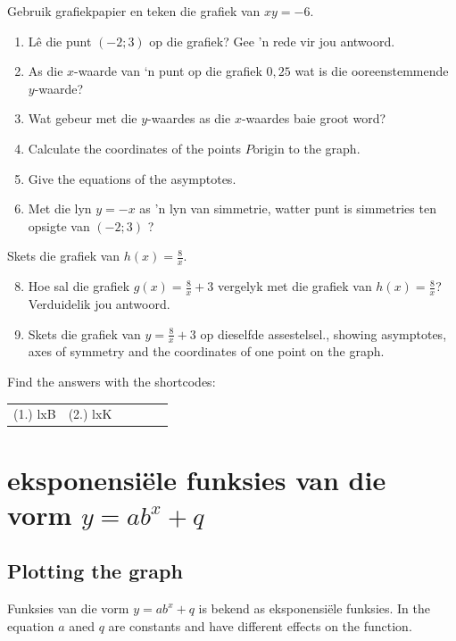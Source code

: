 \begin{exercises}{}
{
Gebruik grafiekpapier en teken die grafiek van  $xy=-6$.
    \begin{enumerate}[noitemsep, label=\textbf{\arabic*}. ] 
    \item Lê die punt $(-2; 3)$  op die grafiek? Gee ’n rede vir jou antwoord.

    \item As die $x$-waarde van ‘n punt op die grafiek $0,25$ wat is die ooreenstemmende $y$-waarde?
    \item Wat gebeur met die $y$-waardes as die $x$-waardes baie groot word?
\item Calculate the coordinates of the points $P$origin to the graph.
\item Give the equations of the asymptotes.
    \item Met die lyn $y=-x$ as ’n lyn van simmetrie, watter punt is simmetries ten opsigte van $(-2; 3)$ ?
    \end{enumerate}
Skets die grafiek van  $h(x)=\frac{8}{x}$.
    \begin{enumerate}[noitemsep, label=\textbf{\arabic*}. ] 
\setcounter{enumi}{7}
    \item Hoe sal die grafiek $g(x)=\frac{8}{x}+3$ vergelyk met die grafiek van $h(x)=\frac{8}{x}$? Verduidelik jou antwoord.
    \item Skets die grafiek van $y=\frac{8}{x}+3$ op dieselfde assestelsel., showing asymptotes, axes of symmetry and the coordinates of one point on the graph.
    \end{enumerate}


\par {} Find the answers with the shortcodes:
\par \begin{tabular}[h]{cccccc}
(1.) lxB  &  (2.) lxK  & \end{tabular}
}
\end{exercises}

\section{eksponensiële funksies van die vorm $y=ab^{x}+q$}

\subsection*{Plotting the graph}         
Funksies van die vorm $y=ab^{x}+q$ is bekend as eksponensiële funksies. In the equation $a$ aned $q$ are constants and have different effects on the function.

